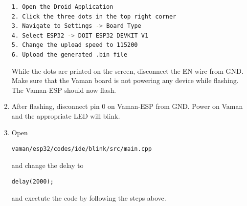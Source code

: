 \begin{enumerate}[label=\thesubsection.\arabic*.,ref=\thesubsection.\theenumi]
\begin{lstlisting}[language=bash]
1. Open the Droid Application
2. Click the three dots in the top right corner
3. Navigate to Settings -> Board Type
4. Select ESP32 -> DOIT ESP32 DEVKIT V1
5. Change the upload speed to 115200
6. Upload the generated .bin file
\end{lstlisting}
While the dots are printed on the screen, disconnect the EN wire from GND.   Make sure that the Vaman board is not powering any device while flashing.  The Vaman-ESP should now flash.

\item After flashing, disconnect pin 0 on Vaman-ESP from GND. Power on Vaman and the appropriate LED will blink.
\item Open
\begin{lstlisting}
vaman/esp32/codes/ide/blink/src/main.cpp 
\end{lstlisting}
and change the delay to 
\begin{lstlisting}
delay(2000);
\end{lstlisting}
and exectute the code by following the steps above.
\end{enumerate}
